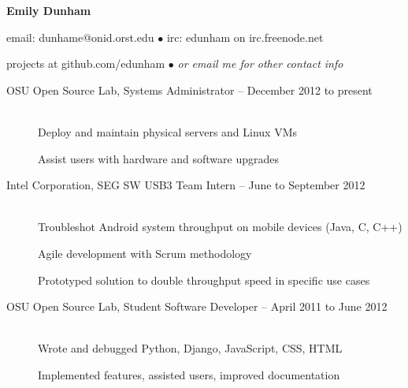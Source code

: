 \documentclass[11pt]{article}
\begin{document}
\centerline{{\LARGE \bf Emily Dunham}}

\bigskip

\centerline{email: dunhame@onid.orst.edu
        $\bullet$
        irc: edunham on irc.freenode.net}
\centerline{projects at github.com/edunham 
        $\bullet$
        \emph{or email me for other contact info}}

\bigskip
\hrulefill
\bigskip

\begin{description}
\item[OSU Open Source Lab, Systems Administrator -- December 2012 to present]
    \hfill \\
    Deploy and maintain physical servers and Linux VMs

    Assist users with hardware and software upgrades

\item[Intel Corporation, SEG SW USB3 Team Intern -- June to September
2012]
    \hfill \\
    Troubleshot Android system throughput on mobile devices (Java, C, C++)

    Agile development with Scrum methodology

    Prototyped solution to double throughput speed in specific use cases

\item[OSU Open Source Lab, Student Software Developer -- April 2011 to June
2012]
    \hfill \\
    Wrote and debugged Python, Django, JavaScript, CSS, HTML

    Implemented features, assisted users, improved documentation
\end{description}

\smallskip
\hrulefill
\bigskip
\end{document}
